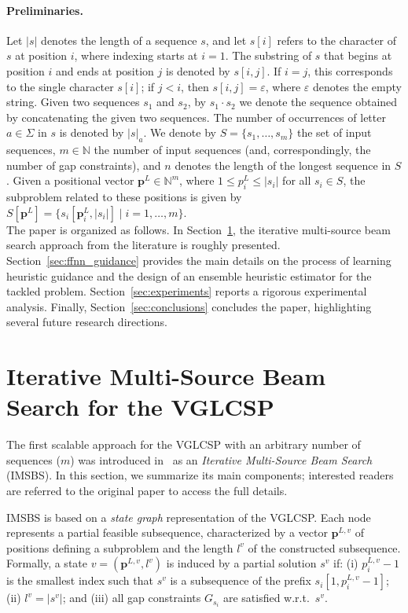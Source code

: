 \documentclass[runningheads]{llncs}
\begin{document}
\paragraph{Preliminaries.}	Let $|s|$ denotes the length of a sequence $s$, and let $s[i]$ refers to the character of $s$ at position $i$, where indexing starts at $i = 1$. The substring of $s$ that begins at position $i$ and ends at position $j$ is denoted by $s[i,j]$. If $i = j$, this corresponds to the single character $s[i]$; if $j < i$, then $s[i,j] = \varepsilon$, where $\varepsilon$ denotes the empty string.	Given two sequences $s_1$ and $s_2$, by $s_1 \cdot s_2$ we denote the sequence obtained by concatenating the given two sequences. 
The number of occurrences of letter $a \in \Sigma$ in $s$ is denoted by $|s|_a$.	We denote by $S = \{s_1, \ldots, s_m\}$ the set of input sequences, $m \in \mathbb{N}$ the number of input sequences (and, correspondingly, the number of gap constraints), and $n$ denotes the length of the longest sequence in $S$.  Given a positional vector $\mathbf{p}^L \in \mathbb{N}^m$, where $1 \leq p^L_i \leq |s_i|$ for all $s_i \in S$, the subproblem related to these positions is given by $S[\mathbf{p}^L]=\{ s_i[\mathbf{p}^L_i, |s_i|] \mid i=1, \ldots, m\}$. \\
  
The paper is organized as follows. In Section~\ref{sec:imsbs}, the iterative multi-source beam search approach from the literature is roughly presented. Section~\ref{sec:ffnn_guidance} provides the main details on the process of learning heuristic guidance and the design of an ensemble heuristic estimator for the tackled problem. Section~\ref{sec:experiments} reports a rigorous experimental analysis. Finally, Section~\ref{sec:conclusions} concludes the paper, highlighting several future research directions. 
 
 
\section{Iterative Multi-Source Beam Search for the VGLCSP}\label{sec:imsbs}

The first scalable approach for the VGLCSP with an arbitrary number of sequences ($m$) was introduced in~\cite{djukanovic2026_eurocast} as an \textit{Iterative Multi-Source Beam Search} (IMSBS). In this section, we summarize its main components; interested readers are referred to the original paper to access the  full details.

IMSBS is based on a \textit{state graph} representation of the VGLCSP. Each node represents a partial feasible subsequence, characterized by a vector $\mathbf{p}^{L,v}$ of positions defining a subproblem and the length $l^v$ of the constructed subsequence. Formally, a state $v=(\mathbf{p}^{L,v}, l^v)$ is induced by a partial solution $s^v$ if: (i) $p^{L,v}_i-1$ is the smallest index such that $s^v$ is a subsequence of the prefix $s_i[1, p^{L,v}_i-1]$; (ii) $l^v=|s^v|$; and (iii) all gap constraints $G_{s_i}$ are satisfied w.r.t.\  $s^v$. 
\end{document}
